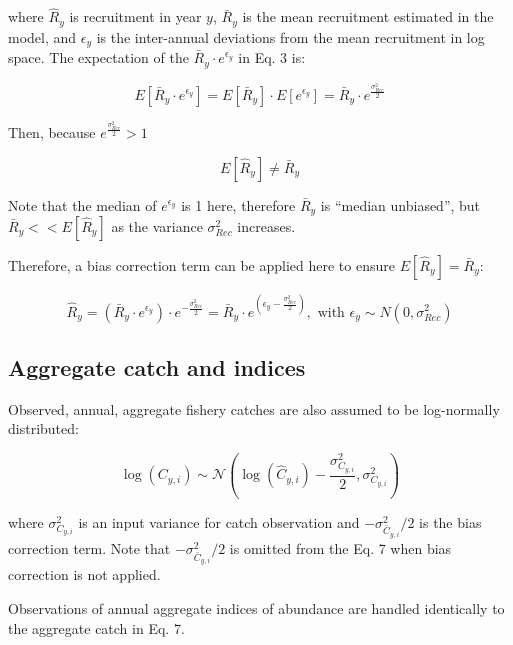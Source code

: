 \documentclass[
  12pt,
]{article}
\begin{document}
where \(\hat{R}_{y}\) is recruitment in year \(y\), \(\bar{R}_{y}\) is
the mean recruitment estimated in the model, and \(\epsilon_{y}\) is the
inter-annual deviations from the mean recruitment in log space. The
expectation of the \(\bar{R}_{y} \cdot e^{\epsilon_{y}}\) in Eq. 3 is:

\begin{equation}
E[\bar{R}_{y} \cdot e^{\epsilon_{y}}] = E[\bar{R}_{y}] \cdot E[e^{\epsilon_{y}}] =
\bar{R}_{y} \cdot e^\frac{\sigma_{Rec}^2}{2}
\end{equation}

Then, because \(e^\frac{\sigma_{Rec}^2}{2} > 1\)

\begin{equation}
E[\hat{R}_{y}] \neq \bar{R}_{y}
\end{equation}

Note that the median of \(e^{\epsilon_{y}}\) is 1 here, therefore
\(\bar{R}_{y}\) is ``median unbiased'', but
\(\bar{R}_{y} << E[\hat{R}_{y}]\) as the variance \(\sigma_{Rec}^2\)
increases.

Therefore, a bias correction term can be applied here to ensure
\(E[\hat{R}_{y}] = \bar{R}_{y}\):

\begin{equation}
\hat{R}_{y} = \left(\bar{R}_{y} \cdot e^{\epsilon_{y}}\right) \cdot e^{-\frac{\sigma_{Rec}^2}{2}} = \bar{R}_{y} \cdot e^{\left(\epsilon_{y} - \frac{\sigma_{Rec}^2}{2}\right)}, \text{ with } \epsilon_y \sim N(0, \sigma_{Rec}^2)
\end{equation}

\subsection{Aggregate catch and
indices}\label{aggregate-catch-and-indices}

Observed, annual, aggregate fishery catches are also assumed to be
log-normally distributed:

\begin{equation}
\log(C_{y,i}) \sim \mathcal{N} \left( \log(\hat{C}_{y,i}) - \frac{\sigma^2_{C_{y,i}}}{2}, \sigma^2_{C_{y,i}} \right)
\end{equation}

where \(\sigma^2_{C_{y,i}}\) is an input variance for catch observation
and \(-\sigma^2_{\bar{C}_{y,i}}/2\) is the bias correction term. Note
that \(-\sigma^2_{\bar{C}_{y,i}}/2\) is omitted from the Eq. 7 when bias
correction is not applied.

Observations of annual aggregate indices of abundance are handled
identically to the aggregate catch in Eq. 7.
\end{document}
